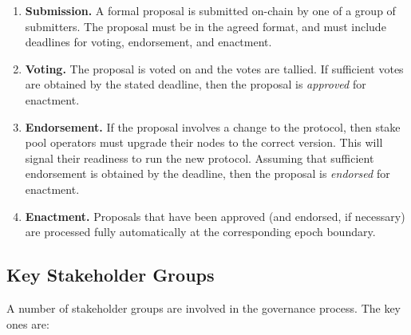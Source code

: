 \begin{enumerate}
\item
  \textbf{Submission.}  A formal proposal is submitted on-chain by one of a group of submitters.  The proposal must be in the agreed format, and must include deadlines for voting, endorsement, and enactment.
\item
  \textbf{Voting.}  The proposal is voted on and the votes are tallied.  If sufficient votes are obtained by the stated deadline, then the proposal is \emph{approved} for enactment.
\item
  \textbf{Endorsement.}  If the proposal involves a change to the protocol, then stake pool operators must upgrade their nodes to the correct version.  This will signal their readiness to run the new protocol.
  Assuming that sufficient endorsement is obtained by the deadline, then the proposal is \emph{endorsed} for enactment.
\item
  \textbf{Enactment.}  Proposals that have been approved (and endorsed, if necessary) are processed fully automatically at the corresponding epoch boundary.
\end{enumerate}

\newpage
\subsection{Key Stakeholder Groups}

A number of stakeholder groups are involved in the governance process.  The key ones are:

